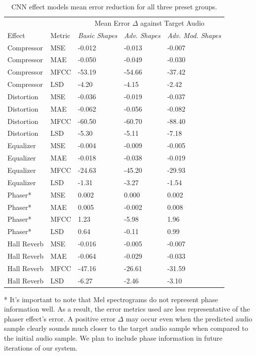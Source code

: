 \documentclass{article}
\begin{document}
\begin{table}[h]
  \caption{CNN effect models mean error reduction for all three preset groups.}
  \centering
  \begin{tabular}{lllll}
    \toprule
    && \multicolumn{3}{c}{Mean Error $\Delta$ against Target Audio} \\
    \cmidrule(r){3-5}
    Effect & Metric & \emph{Basic Shapes} & \emph{Adv. Shapes} & \emph{Adv. Mod. Shapes} \\
    \midrule
    Compressor & MSE  & -0.012 & -0.013 & -0.007 \\
    Compressor & MAE  & -0.050 & -0.049 & -0.030 \\
    Compressor & MFCC & -53.19 & -54.66 & -37.42 \\
    Compressor & LSD  & -4.20  & -4.15  & -2.42  \\
    \midrule
    Distortion & MSE  & -0.036 & -0.019 & -0.037 \\
    Distortion & MAE  & -0.062 & -0.056 & -0.082 \\
    Distortion & MFCC & -60.50 & -60.70 & -88.40 \\
    Distortion & LSD  & -5.30  & -5.11  & -7.18  \\
    \midrule
    Equalizer & MSE   & -0.004 & -0.009 & -0.005 \\
    Equalizer & MAE   & -0.018 & -0.038 & -0.019 \\
    Equalizer & MFCC  & -24.63 & -45.20 & -29.93 \\
    Equalizer & LSD   & -1.31  & -3.27  & -1.54  \\
    \midrule
    Phaser* & MSE      & 0.002  & 0.000  & 0.002  \\
    Phaser* & MAE      & 0.005  & -0.002 & 0.008  \\
    Phaser* & MFCC     & 1.23   & -5.98  & 1.96   \\
    Phaser* & LSD      & 0.64   & -0.11  & 0.99   \\
    \midrule
    Hall Reverb & MSE  & -0.016 & -0.005 & -0.007 \\
    Hall Reverb & MAE  & -0.064 & -0.029 & -0.033 \\
    Hall Reverb & MFCC & -47.16 & -26.61 & -31.59 \\
    Hall Reverb & LSD  & -6.27  & -2.46  & -3.10  \\
    \bottomrule
  \end{tabular}
\end{table}

* It's important to note that Mel spectrograms do not represent phase information well. As a result, the error metrics used are less representative of the phaser effect's error. A positive error $\Delta$ may occur even when the predicted audio sample clearly sounds much closer to the target audio sample when compared to the initial audio sample. We plan to include phase information in future iterations of our system.
\end{document}
